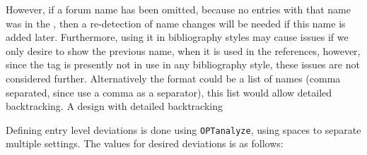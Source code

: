 However, if a forum name has been omitted, because no entries with
that name was in the , then a re-detection of name changes
will be needed if this name is added later.  Furthermore, using it in
bibliography styles may cause issues if we only desire to show the
previous name, when it is used in the references, however, since the
tag is presently not in use in any bibliography style, these issues
are not considered further.  Alternatively the format could be a list
of names (comma separated, since {\bibtex} use a comma as a
separator), this list would allow detailed backtracking.  A design
with detailed backtracking

Defining entry level deviations is done using \texttt{OPTanalyze},
using spaces to separate multiple settings.  The values for desired
deviations is as follows:

